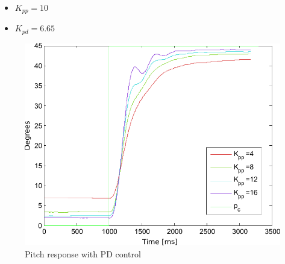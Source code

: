 \begin{itemize}
    \item $K_{pp} = 10$
    \item $K_{pd} = 6.65$
\end{itemize}
\begin{figure}[!!ht!!!!!!!!tb!!]
	\centering
		\includegraphics[width=1\textwidth,trim={0cm 0cm 0cm 0cm},clip]{figures/P2p1_K_pp_label.pdf}
	\caption{Pitch response with PD control}
\label{fig:P2p1_K_pp}
\end{figure}

\clearpage

